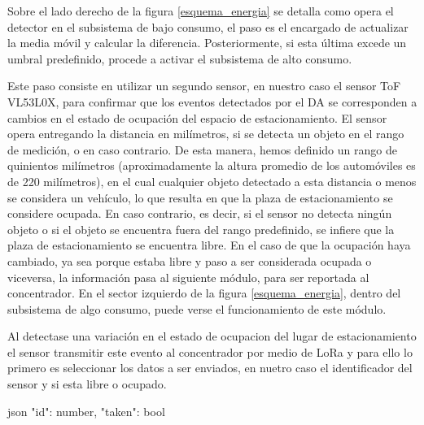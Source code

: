 
Sobre el lado derecho de la figura \ref{esquema_energia} se detalla como opera el detector en el subsistema de bajo consumo, el paso  es el encargado de actualizar la media móvil y calcular la diferencia. Posteriormente, si esta última excede un umbral predefinido, procede a activar el subsistema de alto consumo.


Este paso consiste en utilizar un segundo sensor, en nuestro caso el sensor ToF VL53L0X, para confirmar que los eventos detectados por el DA se corresponden a cambios en el estado de ocupación del espacio de estacionamiento. El sensor opera entregando la distancia en milímetros, si se detecta un objeto en el rango de medición, o  en caso contrario. De esta manera, hemos definido un rango de quinientos milímetros (aproximadamente la altura promedio de los automóviles es de 220 milímetros), en el cual cualquier objeto detectado a esta distancia o menos se considera un vehículo, lo que resulta en que la plaza de estacionamiento se considere ocupada. En caso contrario, es decir, si el sensor no detecta ningún objeto o si el objeto se encuentra fuera del rango predefinido, se infiere que la plaza de estacionamiento se encuentra libre.
En el caso de que la ocupación haya cambiado, ya sea porque estaba libre y paso a ser considerada ocupada o viceversa, la información pasa al siguiente módulo, para ser reportada al concentrador.
En el sector izquierdo de la figura \ref{esquema_energia}, dentro del subsistema de algo consumo, puede verse el funcionamiento de este módulo.

Al detectase una variación en el estado de ocupacion del lugar de estacionamiento el sensor transmitir este evento al concentrador por medio de LoRa y para ello lo primero es seleccionar los datos a ser enviados, en nuetro caso el identificador del sensor y si esta libre o ocupado.

\begin{sourcecode}{json}{}
{
    "id": number,
    "taken": bool
}
\end{sourcecode}


